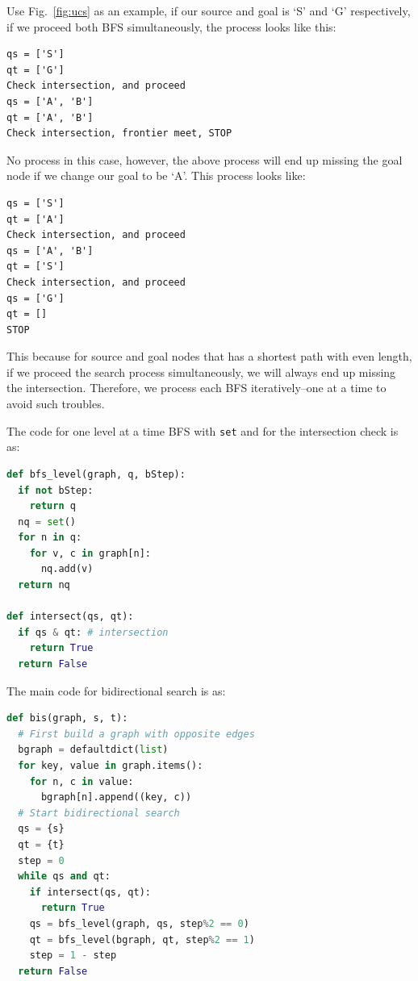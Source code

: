 \documentclass[main.tex]{subfiles}
\begin{document}
Use Fig.~\ref{fig:ucs} as an example, if our source and goal is `S' and `G' respectively, if we proceed both  BFS simultaneously, the process looks like this:
\begin{lstlisting}[numbers=none]
qs = ['S']
qt = ['G']
Check intersection, and proceed
qs = ['A', 'B']
qt = ['A', 'B']
Check intersection, frontier meet, STOP
\end{lstlisting}
No process in this case, however, the above process will end up missing the goal node if we change our goal to be `A'. This process looks like:
\begin{lstlisting}[numbers=none]
qs = ['S']
qt = ['A']
Check intersection, and proceed
qs = ['A', 'B']
qt = ['S']
Check intersection, and proceed
qs = ['G']
qt = []
STOP
\end{lstlisting}
This because for source and goal nodes that has a shortest path with even length, if we proceed the search process simultaneously, we will always end up missing the intersection. Therefore, we process each BFS iteratively--one at a time to avoid such troubles. 

The code for one level at a time BFS with \texttt{set} and for the intersection check is as:
\begin{lstlisting}[language=Python]
def bfs_level(graph, q, bStep):
  if not bStep:
    return q
  nq = set()
  for n in q:
    for v, c in graph[n]:
      nq.add(v)
  return nq

def intersect(qs, qt):
  if qs & qt: # intersection 
    return True
  return False
\end{lstlisting}
The main code for bidirectional search is as:
\begin{lstlisting}[language=Python]
def bis(graph, s, t):
  # First build a graph with opposite edges 
  bgraph = defaultdict(list)
  for key, value in graph.items():
    for n, c in value:
      bgraph[n].append((key, c))
  # Start bidirectional search
  qs = {s}
  qt = {t}
  step = 0
  while qs and qt:
    if intersect(qs, qt):
      return True
    qs = bfs_level(graph, qs, step%2 == 0)
    qt = bfs_level(bgraph, qt, step%2 == 1)
    step = 1 - step
  return False
\end{lstlisting}
\end{document}

